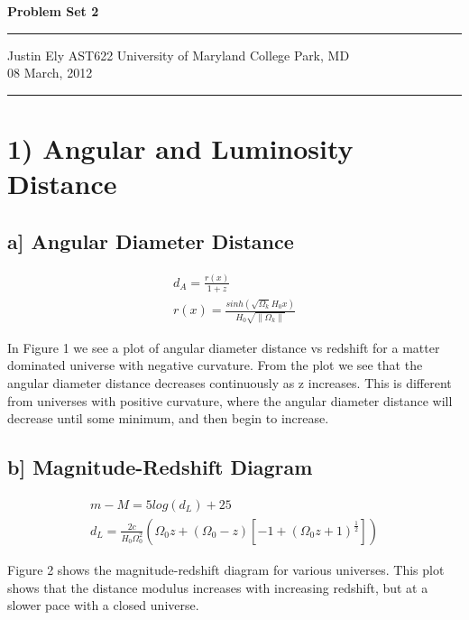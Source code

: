 \documentclass[a4paper,11pt]{article}
\begin{document}
\begin{flushright}

\vspace{1.1cm}

{\bf\Huge Problem Set 2}

\rule{0.25\linewidth}{0.5pt}

\vspace{0.5cm}
Justin Ely
\linebreak
\newline
\footnotesize{AST622 University of Maryland College Park, MD\\}
\vspace{0.5cm}
08 March, 2012
\end{flushright}

\noindent\rule{\linewidth}{1.0pt}
\section*{1) Angular and Luminosity Distance}
\subsection*{a] Angular Diameter Distance}

\begin{eqnarray}
d_A=\frac{r(x)}{1+z}  \\
r(x)=\frac{sinh(\sqrt{\Omega_k}H_0 x)}{H_0 \sqrt{\|{\Omega_k}\|}}
\end{eqnarray}


In Figure 1 we see a plot of angular diameter distance vs redshift for a matter dominated universe with negative curvature.  From the plot we see that the angular diameter distance decreases continuously as z increases.  This is different from universes with positive curvature, where the angular diameter distance will decrease until some minimum, and then begin to increase.  


\subsection*{b] Magnitude-Redshift Diagram}
\begin{eqnarray}
m-M=5log(d_L)+25 \\
d_L=\frac{2c}{H_0 \Omega_0^2}(\Omega_0 z +(\Omega_0 -z)[-1+(\Omega_0 z+1)^{\frac{1}{2}}])
\end{eqnarray}

Figure 2 shows the magnitude-redshift diagram for various universes.  This plot shows that the distance modulus increases with increasing redshift, but at a slower pace with a closed universe.
\end{document}
